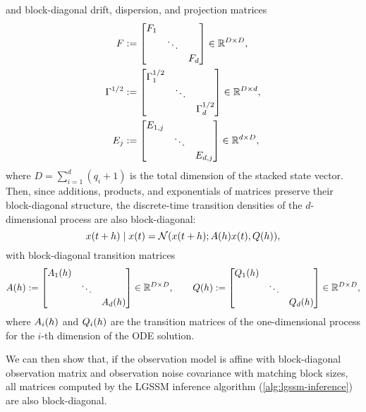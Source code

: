 \documentclass{mimosis}
\begin{document}
and block-diagonal drift, dispersion, and projection matrices
\begin{subequations}
\begin{align}
  \drift &:= \mqty[\dmat{\drift_1, \ddots, \drift_d}] \in \mathbb{R}^{D \times D},
\\
  \disp &:= \mqty[\dmat{\disp_1, \ddots, \disp_d}] \in \mathbb{R}^{D \times d},
\\
  \proj{j} &:= \mqty[\dmat{\proj{1,j}, \ddots, \proj{d,j}}] \in \mathbb{R}^{d \times D},
\end{align}
\end{subequations}
where \(D = \sum_{i=1}^d (q_i+1)\) is the total dimension of the stacked state vector.
Then, since additions, products, and exponentials of matrices preserve their block-diagonal structure, the discrete-time transition densities of the \(d\)-dimensional process are also block-diagonal:
\begin{equation}
  \st(t+h) \mid \st(t) = \N(\st(t+h); \transA(h) \st(t), \transC(h)),
\end{equation}
with block-diagonal transition matrices
\begin{equation}
  \transA(h) := \mqty[\dmat{\transA_1(h), \ddots, \transA_d(h)}] \in \mathbb{R}^{D \times D},
\qquad
  \transC(h) := \mqty[\dmat{\transC_1(h), \ddots, \transC_d(h)}] \in \mathbb{R}^{D \times D},
\end{equation}
where \(A_i(h)\) and \(Q_i(h)\) are the transition matrices of the one-dimensional process for the \(i\)-th dimension of the ODE solution.

\par
We can then show that, if the observation model is affine with block-diagonal observation matrix and observation noise covariance with matching block sizes, all matrices computed by the LGSSM inference algorithm (\ref{alg:lgssm-inference}) are also block-diagonal.
\end{document}
